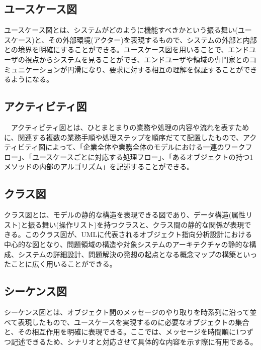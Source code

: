 \subsection*{ユースケース図\cite{uml}}
ユースケース図とは、システムがどのように機能すべきかという振る舞い(ユースケース)と、その外部環境(アクター)を表現するもので、システムの外部と内部との境界を明確にすることができる。ユースケース図を用いることで、エンドユーザの視点からシステムを見ることができ、エンドユーザや領域の専門家とのコミュニケーションが円滑になり、要求に対する相互の理解を保証することができるようになる。

\subsection*{アクティビティ図\cite{uml}}
　アクティビティ図とは、ひとまとまりの業務や処理の内容や流れを表すために、関連する複数の業務手順や処理ステップを順序だてて配置したもので、アクティビティ図によって、「企業全体や業務全体のモデルにおける一連のワークフロー」、「ユースケースごとに対応する処理フロー」、「あるオブジェクトの持つ1メソッドの内部のアルゴリズム」を記述することができる。

\subsection*{クラス図\cite{uml}}
クラス図とは、モデルの静的な構造を表現できる図であり、データ構造(属性リスト)と振る舞い(操作リスト)を持つクラスと、クラス間の静的な関係が表現できる。このクラス図が、UMLに代表されるオブジェクト指向分析設計における中心的な図となり、問題領域の構造や対象システムのアーキテクチャの静的な構成、システムの詳細設計、問題解決の発想の起点となる概念マップの構築といったことに広く用いることができる。

\subsection*{シーケンス図\cite{uml}}
シーケンス図とは、オブジェクト間のメッセージのやり取りを時系列に沿って並べて表現したもので、ユースケースを実現するのに必要なオブジェクトの集合と、その相互作用を明確に表現できる。ここでは、メッセージを時間順に1つずつ記述できるため、シナリオと対応させて具体的な内容を示す際に有用である。
